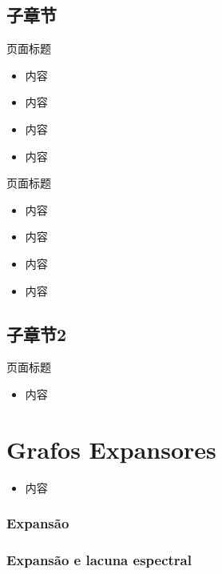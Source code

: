 \documentclass{beamer}
\begin{document}
\subsection{子章节}

\begin{frame}{页面标题}
    \begin{itemize}
        \item 内容
        \item 内容
        \item 内容
        \item 内容
    \end{itemize}
\end{frame}

\begin{frame}{页面标题}
    \begin{itemize}
        \item 内容
        \item 内容
        \item 内容
        \item 内容
    \end{itemize}
\end{frame}
\subsection{子章节2}

\begin{frame}{页面标题}
    \begin{itemize}
        \item 内容
    \end{itemize}
\end{frame}

\section{Grafos Expansores}
\begin{frame}
    \begin{itemize}
        \item 内容
    \end{itemize}
\end{frame}

\subsubsection{Expansão}
\subsubsection{Expansão e lacuna espectral}
\end{document}
